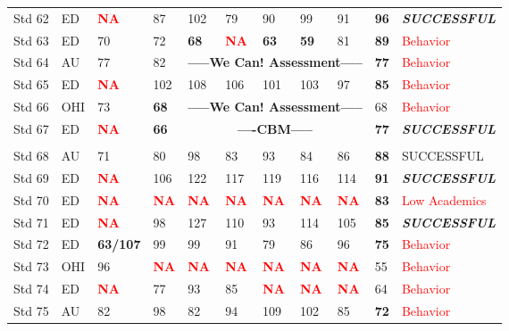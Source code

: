 \documentclass[twoside]{article}
\begin{document}
\begin{tiny}
\begin{landscape}
\begin{longtable}{p{1.5cm}p{1.5cm}p{1.5cm}p{1.5cm}p{1.75cm}p{1.75cm}p{1.75cm}p{1.75cm}p{1.75cm}p{1.75cm}p{2.5cm}@{}}
Std 62 & ED & \textcolor{red}{\textbf{NA}} & 87 & 102 & 79 & 90 & 99 & 91 & \textbf{96} & \textbf{\textit{SUCCESSFUL}}\\
Std 63 & ED & 70 & 72 & \textbf{68} & \textcolor{red}{\textbf{NA}} & \textbf{63} & \textbf{59} & 81 & \textbf{89} & \textcolor{red}{Behavior}\\
Std 64 & AU & 77 & 82 & \multicolumn{5}{c}{\textbf{-----We Can! Assessment-----}} & \textbf{77} & \textcolor{red}{Behavior} \\
Std 65 & ED & \textcolor{red}{\textbf{NA}} & 102 & 108 & 106 & 101 & 103 & 97 & \textbf{85} & \textcolor{red}{Behavior} \\
Std 66 & OHI & 73 & \textbf{68} & \multicolumn{5}{c}{\textbf{-----We Can! Assessment-----}} & 68 & \textcolor{red}{Behavior} \\
Std 67 & ED & \textcolor{red}{\textbf{NA}} & \textbf{66} & \multicolumn{5}{c}{\textbf{----CBM-----}} & \textbf{77} & \textbf{\textit{SUCCESSFUL}} \\
\hline\\
Std 68 & AU & 71 & 80 & 98 & 83 & 93 & 84 & 86 & \textbf{88} & SUCCESSFUL \\
Std 69 & ED & \textcolor{red}{\textbf{NA}} & 106 & 122 & 117 & 119 & 116 & 114 & \textbf{91} & \textbf{\textit{SUCCESSFUL}} \\
Std 70 & ED & \textcolor{red}{\textbf{NA}} & \textcolor{red}{\textbf{NA}} & \textcolor{red}{\textbf{NA}} & \textcolor{red}{\textbf{NA}} & \textcolor{red}{\textbf{NA}} & \textcolor{red}{\textbf{NA}} & \textcolor{red}{\textbf{NA}} & \textbf{83} & \textcolor{red}{Low Academics}  \\
Std 71 & ED & \textcolor{red}{\textbf{NA}} & 98 & 127 & 110 & 93 & 114 & 105 & {\textbf{85}} & \textbf{\textit{SUCCESSFUL}} \\
Std 72 & ED & \textbf{63/107} & 99 & 99 & 91 & 79 & 86 & 96 & \textbf{75} & \textcolor{red}{Behavior}  \\
Std 73 & OHI & 96 & \textcolor{red}{\textbf{NA}} & \textcolor{red}{\textbf{NA}} & \textcolor{red}{\textbf{NA}} & \textcolor{red}{\textbf{NA}} & \textcolor{red}{\textbf{NA}} & \textcolor{red}{\textbf{NA}} & 55 & \textcolor{red}{Behavior}  \\
Std 74 & ED & \textcolor{red}{\textbf{NA}} & 77 & 93 & 85 & \textcolor{red}{\textbf{NA}} & \textcolor{red}{\textbf{NA}} & \textcolor{red}{\textbf{NA}} & 64 & \textcolor{red}{Behavior}  \\
Std 75 & AU & 82 & 98 & 82 & 94 & 109 & 102 & 85 & \textbf{72} & \textcolor{red}{Behavior}  \\

\end{longtable}
\end{landscape}
\end{tiny}
\end{document}
